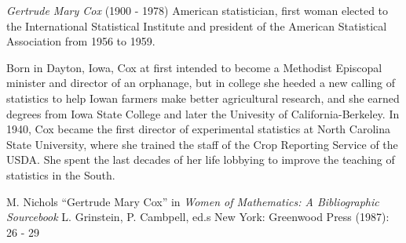 \documentclass[12pt]{article}
\begin{document}

\emph{Gertrude Mary Cox} (1900 - 1978) American statistician, first woman elected to the International Statistical Institute and president of the American Statistical Association from 1956 to 1959.

Born in Dayton, Iowa, Cox at first intended to become a Methodist Episcopal minister and director of an orphanage, but in college she heeded a new calling of statistics to help Iowan farmers make better agricultural research, and she earned degrees from Iowa State College and later the Univesity of California-Berkeley. In 1940, Cox became the first director of experimental statistics at North Carolina State University, where she trained the staff of the Crop Reporting Service of the USDA. She spent the last decades of her life lobbying to improve the teaching of statistics in the South.

\begin{thebibliography}{1}
 M. Nichols ``Gertrude Mary Cox'' in {\it Women of Mathematics: A Bibliographic Sourcebook} L. Grinstein, P. Cambpell, ed.s New York: Greenwood Press (1987): 26 - 29
\end{thebibliography}
\end{document}
